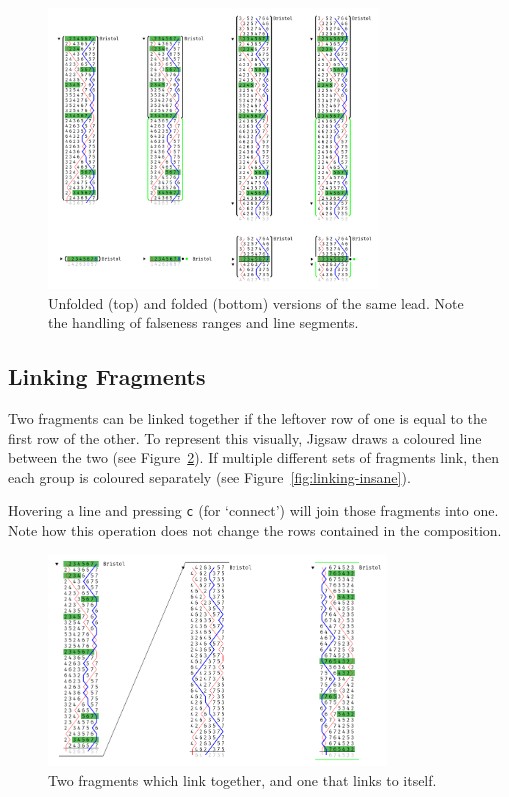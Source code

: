 \documentclass[12pt]{article}
\begin{document}
\begin{figure}
    \centering
    \includegraphics[width=0.78\textwidth]{folding-full}
    \caption{Unfolded (top) and folded (bottom) versions of the same lead.  Note the handling of
    falseness ranges and line segments.}\label{fig:lead-folding}
\end{figure}

\subsection{Linking Fragments}

Two fragments can be linked together if the leftover row of one is equal to the first row of the
other.  To represent this visually, Jigsaw draws a coloured line between the two (see
Figure~\ref{fig:linking}).  If multiple different sets of fragments link, then each group is
coloured separately (see Figure~\ref{fig:linking-insane}).

Hovering a line and pressing \verb|c| (for `connect') will join those fragments into one.  Note how
this operation does not change the rows contained in the composition.

\begin{figure}
    \centering
    \includegraphics[width=0.8\textwidth]{linking-2}
    \caption{Two fragments which link together, and one that links to itself.}\label{fig:linking}
\end{figure}
\end{document}

